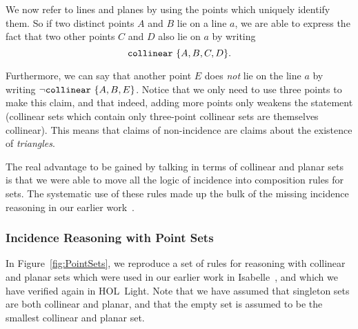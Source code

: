 We now refer to lines and planes by using the points which uniquely identify them. So if two distinct points $A$ and $B$ lie on a line $a$, we are able to express the fact that two other points $C$ and $D$ also lie on $a$ by writing 
\begin{displaymath}
\texttt{collinear}\ \{A, B, C, D\}.
\end{displaymath}

Furthermore, we can say that another point $E$ does \emph{not} lie on the line $a$ by writing $\neg \texttt{collinear}\ \{A, B, E\}$. Notice that we only need to use three points to make this claim, and that indeed, adding more points only weakens the statement (collinear sets which contain only three-point collinear sets are themselves collinear). This means that claims of non-incidence are claims about the existence of \emph{triangles}.

The real advantage to be gained by talking in terms of collinear and planar sets is that we were able to move all the logic of incidence into composition rules for sets. The systematic use of these rules made up the bulk of the missing incidence reasoning in our earlier work~\cite{ScottMScThesis}.

\subsubsection{Incidence Reasoning with Point Sets}\label{sec:PointSets}
In Figure~\ref{fig:PointSets}, we reproduce a set of rules for reasoning with collinear and planar sets which were used in our earlier work in Isabelle~\cite{ScottMScThesis}, and which we have verified again in HOL~Light. Note that we have assumed that singleton sets are both collinear and planar, and that the empty set is assumed to be the smallest collinear and planar set. 

